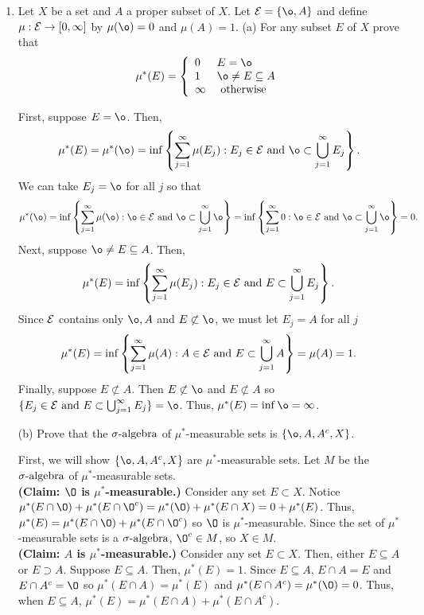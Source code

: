 \begin{enumerate}
\item Let $X$ be a set and $A$ a proper subset of $X$. Let $\E =\{ \o, A \}$ and define $\mu : {\mathcal E} \rightarrow [0, \infty]$ by $\mu(\o)=0$ and $\mu(A)=1$. (a) For any subset $E$ of $X$ prove that 
\[
\mu^*(E)= \left\{
\begin{array}{ll} 
      0 & E=\o \\
      1 & \o \neq E \subseteq A \\  
      \infty & \text{ otherwise}
\end{array} 
 \right. 
\]
\begin{pf}
First, suppose $E = \o$. Then, 
\[
\mu^*(E)=\mu^*(\o)=\inf \left\{ \sum_{j=1}^\infty \mu(E_j) : E_j \in \E \text{ and } \o \subset \bigcup_{j=1}^\infty E_j \right\}.
\]
We can take $E_j = \o$ for all $j$ so that 
\[
\mu^*(\o)=\inf \left\{ \sum_{j=1}^\infty \mu(\o) : \o \in \E \text{ and } \o \subset \bigcup_{j=1}^\infty \o \right\} = \inf \left\{ \sum_{j=1}^\infty 0 : \o \in \E \text{ and } \o \subset \bigcup_{j=1}^\infty \o \right\} = 0.
\]
Next, suppose $\o \neq E \subseteq A$. Then, 
\[
\mu^*(E)=\inf \left\{ \sum_{j=1}^\infty \mu(E_j) : E_j \in {\mathcal E} \text{ and } E \subset \bigcup_{j=1}^\infty E_j \right\}.
\]
Since ${\mathcal E}$ contains only $\o, A$ and $E \not\subset \o$, we must let $E_j = A$ for all $j$
\[
\mu^*(E)=\inf \left\{ \sum_{j=1}^\infty \mu(A) : A \in {\mathcal E} \text{ and } E \subset \bigcup_{j=1}^\infty A \right\}=\mu(A)=1.
\]
Finally, suppose $E \not \subset A$. Then $E \not\subset \o$ and $E \not\subset A$ so $\{ E_j \in \E \text{ and } E \subset \bigcup_{j=1}^\infty E_j \} = \o$. Thus, $\mu^*(E)= \inf \o = \infty$. 
\end{pf}
(b) Prove that the ${\sigma}\text{-algebra}$ of $\mu^*$-measurable sets is $\{ \o, A, A^c, X \}$.\begin{pf}
First, we will show $\{ \o, A, A^c, X \}$ are $\mu^*$-measurable sets. Let $M$ be the ${\sigma}\text{-algebra}$ of $\mu^*$-measurable sets.\\
\textbf{(Claim: $\O$ is $\mu^*$-measurable.)} Consider any set $E \subset X$. Notice $\mu^*(E\cap \O) + \mu^*(E \cap \O^c) = \mu^*(\O) + \mu^*(E \cap X) = 0 + \mu^*(E)$. Thus, $\mu^*(E)=\mu^*(E\cap \O) + \mu^*(E \cap \O^c)$ so $\O$ is $\mu^*$-measurable. Since the set of $\mu^*$-measurable sets is a ${\sigma}\text{-algebra}$, $\O^c \in M$, so $X \in M$. \\
\textbf{(Claim: $A$ is $\mu^*$-measurable.)} Consider any set $E \subset X$. Then, either $E \subseteq A$ or $E \supset A$.  Suppose $E \subseteq A$. Then, $\mu^*(E) = 1$. Since $E \subseteq A$, $E \cap A = E$ and $E \cap A^c=\O$ so  $\mu^*(E \cap A)=\mu^{*}(E)$ and $\mu^*(E \cap A^c) = \mu^*(\O)=0$. Thus, when $E \subseteq A$, $\mu^*(E)=\mu^*(E\cap A) + \mu^*(E \cap A^c)$.\\

\end{pf}
\end{enumerate}

